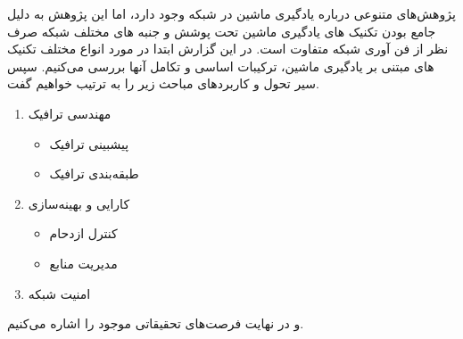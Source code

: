 پژوهش‌های متنوعی درباره یادگیری ماشین در شبکه
وجود دارد، اما این پژوهش به دلیل جامع بودن تکنیک های یادگیری ماشین تحت پوشش و جنبه های مختلف شبکه صرف نظر از فن آوری شبکه متفاوت است. در این گزارش ابتدا در مورد انواع مختلف تکنیک های مبتنی بر یادگیری ماشین، ترکیبات اساسی و تکامل آنها بررسی می‌کنیم. سپس سیر تحول و کاربردهای مباحث زیر را به ترتیب خواهیم گفت.
\begin{enumerate}
    \item مهندسی ترافیک
    \begin{itemize}
        \item پیشبینی ترافیک
        \item طبقه‌بندی ترافیک
    \end{itemize}
    \item کارایی و بهینه‌سازی
    \begin{itemize}
        \item کنترل ازدحام
        \item مدیریت منابع
    \end{itemize}
    \item امنیت شبکه
\end{enumerate}
و در نهایت فرصت‌های تحقیقاتی موجود را اشاره می‌کنیم.

